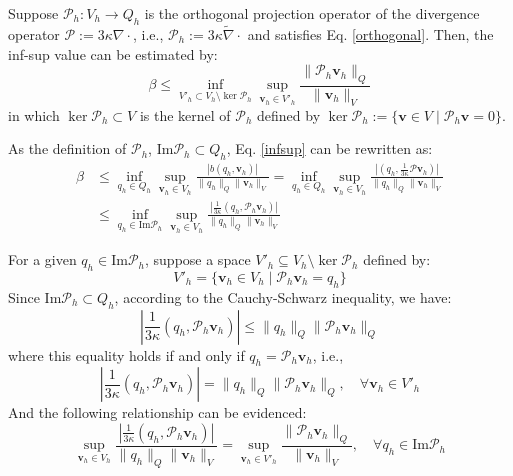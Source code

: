\begin{lma}\label{lma}
Suppose $\mathcal{P}_h: V_h \rightarrow Q_h$ is the orthogonal projection operator of the divergence operator $\mathcal{P} := 3\kappa \nabla \cdot$, i.e., $\mathcal{P}_h := 3\kappa \tilde{\nabla} \cdot$ and satisfies Eq. \eqref{orthogonal}. Then, the inf-sup value can be estimated by:
\begin{equation}\label{r1}
\beta \le \inf_{V'_h \subset V_h \setminus \ker \mathcal{P}_h} \sup_{\boldsymbol{v}_h \in V'_h} \frac{\|\mathcal{P}_h \boldsymbol{v}_h\|_Q}{\|\boldsymbol{v}_h\|_V}
\end{equation}
in which $\ker \mathcal{P}_h \subset V$ is the kernel of $\mathcal{P}_h$ defined by $\ker \mathcal{P}_h := \{\boldsymbol{v} \in V \mid \mathcal{P}_h \boldsymbol{v} = 0\}$.
\end{lma}
\begin{pf}
As the definition of $\mathcal{P}_h$, $\mathrm{Im} \mathcal{P}_h \subset Q_h$, Eq. \eqref{infsup} can be rewritten as:
\begin{equation} \label{r11}
\begin{split}
\beta &\le \inf_{q_h \in Q_h} \sup_{\boldsymbol{v}_h \in V_h} \frac{|b(q_h, \boldsymbol{v}_h)|}{\|q_h\|_Q \|\boldsymbol{v}_h\|_V}
= \inf_{q_h \in Q_h} \sup_{\boldsymbol{v}_h \in V_h} \frac{|(q_h, \frac{1}{3\kappa} \mathcal{P} \boldsymbol{v}_h)|}{\|q_h\|_Q \|\boldsymbol{v}_h\|_V} \\
&\le \inf_{q_h \in \mathrm{Im} \mathcal{P}_h} \sup_{\boldsymbol{v}_h \in V_h} \frac{|\frac{1}{3\kappa} (q_h, \mathcal{P}_h \boldsymbol{v}_h)|}{\|q_h\|_Q \|\boldsymbol{v}_h\|_V}
\end{split}
\end{equation}

For a given $q_h \in \mathrm{Im} \mathcal{P}_h$, suppose a space $V'_h \subseteq V_h \setminus \ker \mathcal{P}_h$ defined by:
\begin{equation}
V'_h = \{\boldsymbol{v}_h \in V_h \mid \mathcal{P}_h \boldsymbol{v}_h = q_h\}
\end{equation}
Since $\mathrm{Im} \mathcal{P}_h \subset Q_h$, according to the Cauchy-Schwarz inequality, we have:
\begin{equation}
\left| \frac{1}{3\kappa} (q_h, \mathcal{P}_h \boldsymbol{v}_h) \right| \le \|q_h\|_Q \|\mathcal{P}_h \boldsymbol{v}_h\|_Q
\end{equation}
where this equality holds if and only if $q_h = \mathcal{P}_h \boldsymbol{v}_h$, i.e.,
\begin{equation}
\left| \frac{1}{3\kappa} (q_h, \mathcal{P}_h \boldsymbol{v}_h) \right| = \|q_h\|_Q \|\mathcal{P}_h \boldsymbol{v}_h\|_Q, \quad \forall \boldsymbol{v}_h \in V'_h
\end{equation}
And the following relationship can be evidenced:
\begin{equation}\label{r12}
\sup_{\boldsymbol{v}_h \in V_h} \frac{\left| \frac{1}{3\kappa} (q_h, \mathcal{P}_h \boldsymbol{v}_h) \right|}{\|q_h\|_Q \|\boldsymbol{v}_h\|_V} = \sup_{\boldsymbol{v}_h \in V'_h} \frac{\|\mathcal{P}_h \boldsymbol{v}_h\|_Q}{\|\boldsymbol{v}_h\|_V}, \quad \forall q_h \in \mathrm{Im} \mathcal{P}_h
\end{equation}


\end{pf}
